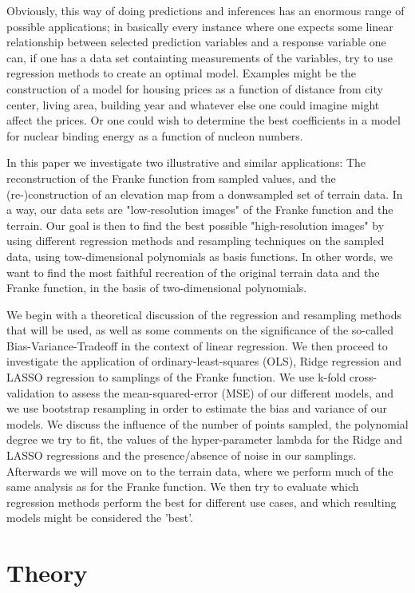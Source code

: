 \documentclass[reprint, english, nofootinbib]{revtex4-2}
\begin{document}
     Obviously, this way of doing predictions and inferences has an enormous range of possible applications; in basically every instance where one expects some linear relationship between selected prediction variables and a response variable one can, if one has a data set containting measurements of the variables, try to use regression methods to create an optimal model. Examples might be the construction of a model for housing prices as a function of distance from city center, living area, building year and whatever else one could imagine might affect the prices. Or one could wish to determine the best coefficients in a model for nuclear binding energy as a function of nucleon numbers.

     In this paper we investigate two illustrative and similar applications: The reconstruction of the Franke function from sampled values, and the (re-)construction of an elevation map from a donwsampled set of terrain data. In a way, our data sets are "low-resolution images" of the Franke function and the terrain. Our goal is then to find the best possible "high-resolution images" by using different regression methods and resampling techniques on the sampled data, using tow-dimensional polynomials as basis functions. In other words, we want to find the most faithful recreation of the original terrain data and the Franke function, in the basis of two-dimensional polynomials.

     We begin with a theoretical discussion of the regression and resampling methods that will be used, as well as some comments on the significance of the so-called Bias-Variance-Tradeoff in the context of linear regression. We then proceed to investigate the application of ordinary-least-squares (OLS), Ridge regression and LASSO regression to samplings of the Franke function. We use k-fold cross-validation to assess the mean-squared-error (MSE) of our different models, and we use bootstrap resampling in order to estimate the bias and variance of our models. We discuss the influence of the number of points sampled, the polynomial degree we try to fit, the values of the hyper-parameter lambda for the Ridge and LASSO regressions and the presence/absence of noise in our samplings. Afterwards we will move on to the terrain data, where we perform much of the same analysis as for the Franke function. We then try to evaluate which regression methods perform the best for different use cases, and which resulting models might be considered the 'best'.


\section{Theory}
\end{document}
